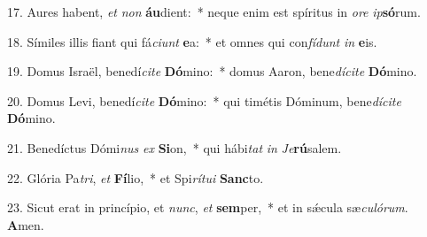 17. Aures habent, \textit{et} \textit{non} \textbf{áu}dient:~*  neque enim est spíritus in \textit{o}\textit{re} \textit{ip}\textbf{só}rum.\

18. Símiles illis fiant qui fá\textit{ci}\textit{unt} \textbf{e}a:~*  et omnes qui con\textit{fí}\textit{dunt} \textit{in} \textbf{e}is.\

19. Domus Israël, benedí\textit{ci}\textit{te} \textbf{Dó}mino:~*  domus Aaron, bene\textit{dí}\textit{ci}\textit{te} \textbf{Dó}mino.\

20. Domus Levi, benedí\textit{ci}\textit{te} \textbf{Dó}mino:~*  qui timétis Dóminum, bene\textit{dí}\textit{ci}\textit{te} \textbf{Dó}mino.\

21. Benedíctus Dómi\textit{nus} \textit{ex} \textbf{Si}on,~*  qui hábi\textit{tat} \textit{in} \textit{Je}\textbf{rú}salem.\

22. Glória Pa\textit{tri}, \textit{et} \textbf{Fí}lio,~*  et Spi\textit{rí}\textit{tu}\textit{i} \textbf{Sanc}to.\

23. Sicut erat in princípio, et \textit{nunc}, \textit{et} \textbf{sem}per,~*  et in sǽcula sæ\textit{cu}\textit{ló}\textit{rum}. \textbf{A}men.\


